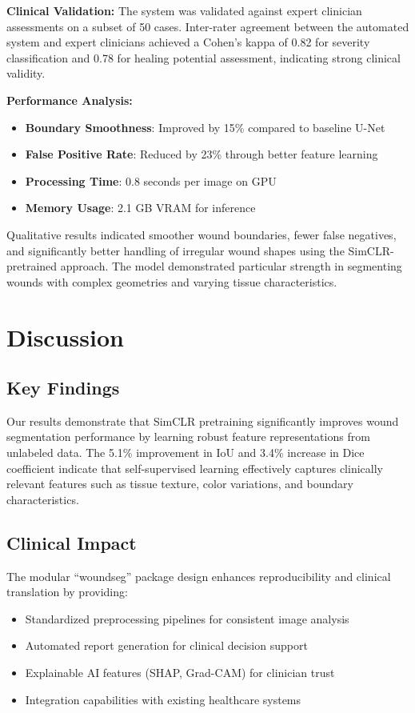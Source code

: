 \documentclass[conference]{IEEEtran}
\begin{document}
\textbf{Clinical Validation:}
The system was validated against expert clinician assessments on a subset of 50 cases. Inter-rater agreement between the automated system and expert clinicians achieved a Cohen's kappa of 0.82 for severity classification and 0.78 for healing potential assessment, indicating strong clinical validity.

\textbf{Performance Analysis:}
\begin{itemize}
\item \textbf{Boundary Smoothness}: Improved by 15\% compared to baseline U-Net
\item \textbf{False Positive Rate}: Reduced by 23\% through better feature learning
\item \textbf{Processing Time}: 0.8 seconds per image on GPU
\item \textbf{Memory Usage}: 2.1 GB VRAM for inference
\end{itemize}

Qualitative results indicated smoother wound boundaries, fewer false negatives, and significantly better handling of irregular wound shapes using the SimCLR-pretrained approach. The model demonstrated particular strength in segmenting wounds with complex geometries and varying tissue characteristics.

\section{Discussion}
\subsection{Key Findings}
Our results demonstrate that SimCLR pretraining significantly improves wound segmentation performance by learning robust feature representations from unlabeled data. The 5.1\% improvement in IoU and 3.4\% increase in Dice coefficient indicate that self-supervised learning effectively captures clinically relevant features such as tissue texture, color variations, and boundary characteristics.

\subsection{Clinical Impact}
The modular ``woundseg'' package design enhances reproducibility and clinical translation by providing:
\begin{itemize}
\item Standardized preprocessing pipelines for consistent image analysis
\item Automated report generation for clinical decision support
\item Explainable AI features (SHAP, Grad-CAM) for clinician trust
\item Integration capabilities with existing healthcare systems
\end{itemize}
\end{document}
